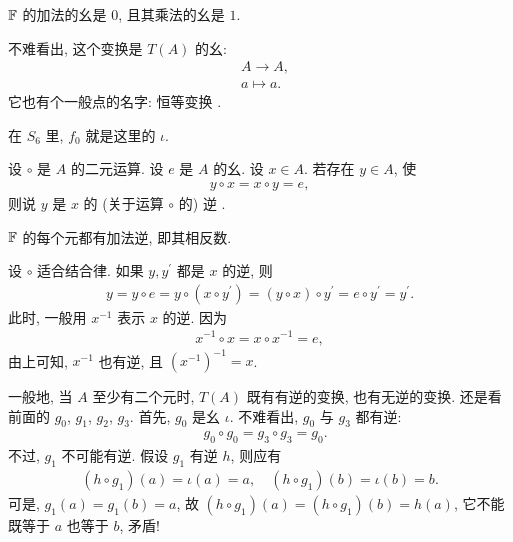 \begin{example}
    $\mathbb{F}$ 的加法的幺是 $0$, 且其乘法的幺是 $1$.
\end{example}

\begin{example}
    不难看出, 这个变换是 $T(A)$ 的幺:
    \begin{align*}
         & A \to A,  \tag*{$\iota$:} \\
         & a \mapsto a.
    \end{align*}
    它也有个一般点的名字: 恒等变换 .

    在 $S_6$ 里, $f_0$ 就是这里的 $\iota$.
\end{example}

\begin{definition}
    设 $\circ$ 是 $A$ 的二元运算. 设 $e$ 是 $A$ 的幺. 设 $x \in A$. 若存在 $y \in A$, 使
    \begin{align*}
        y \circ x = x \circ y = e,
    \end{align*}
    则说 $y$ 是 $x$ 的 (关于运算 $\circ$ 的) 逆 .
\end{definition}

\begin{example}
    $\mathbb{F}$ 的每个元都有加法逆, 即其相反数.
\end{example}

\begin{remark}
    设 $\circ$ 适合结合律. 如果 $y, y^{\prime}$ 都是 $x$ 的逆, 则
    \begin{align*}
        y = y \circ e = y \circ (x \circ y^{\prime}) = (y \circ x) \circ y^{\prime} = e \circ y^{\prime} = y^{\prime}.
    \end{align*}
    此时, 一般用 $x^{-1}$ 表示 $x$ 的逆. 因为
    \begin{align*}
        x^{-1} \circ x = x \circ x^{-1} = e,
    \end{align*}
    由上可知, $x^{-1}$ 也有逆, 且 $(x^{-1})^{-1} = x$.
\end{remark}

\begin{example}
    一般地, 当 $A$ 至少有二个元时, $T(A)$ 既有有逆的变换, 也有无逆的变换. 还是看前面的 $g_0$, $g_1$, $g_2$, $g_3$. 首先, $g_0$ 是幺 $\iota$. 不难看出, $g_0$ 与 $g_3$ 都有逆:
    \begin{align*}
         & g_0 \circ g_0 = g_3 \circ g_3 = g_0.
    \end{align*}
    不过, $g_1$ 不可能有逆. 假设 $g_1$ 有逆 $h$, 则应有
    \begin{align*}
        (h \circ g_1)(a) = \iota(a) = a, \quad (h \circ g_1)(b) = \iota(b) = b.
    \end{align*}
    可是, $g_1(a) = g_1(b) = a$, 故 $(h \circ g_1)(a) = (h \circ g_1)(b) = h(a)$, 它不能既等于 $a$ 也等于 $b$, 矛盾!
\end{example}

